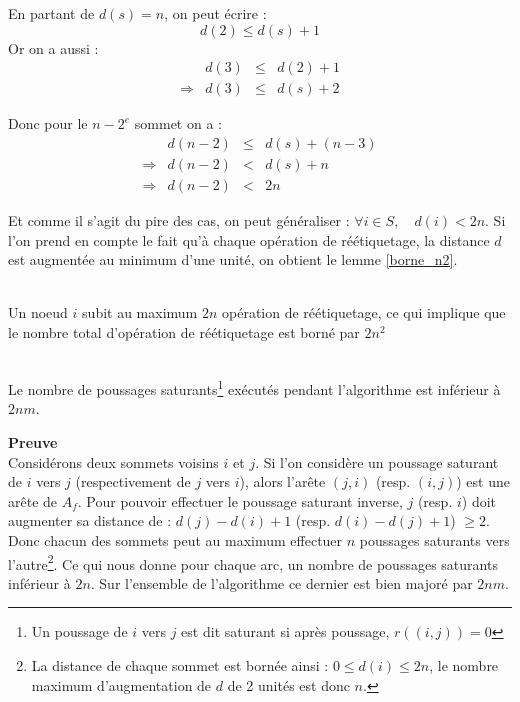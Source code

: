 En partant de $d(s) = n$, on peut écrire : $$
d(2) \leq d(s) + 1 $$ Or on a aussi : $$
\begin{array}{lrcl}
	&d(3) & \leq & d(2) + 1 \\
\Rightarrow & d(3) & \leq & d(s) + 2
\end{array} $$

Donc pour le $n-2^e$ sommet on a : $$
\begin{array}{lrcl}
	&d(n-2) &\leq& d(s) + (n - 3) \\
\Rightarrow & d(n-2) & < & d(s) + n \\
\Rightarrow & d(n-2) & < & 2n 
\end{array} $$

Et comme il s'agit du pire des cas, on peut généraliser : $\forall i \in S, \quad d(i) < 2n $.
Si l'on prend en compte le fait qu'à chaque opération de réétiquetage, la distance $d$ est augmentée
au minimum d'une unité, on obtient le lemme \ref{borne_n2}.

\begin{lemma}~\\
	\label{borne_n2}
	Un noeud $i$ subit au maximum $2n$ opération de réétiquetage, ce qui implique que le nombre total
	d'opération de réétiquetage est borné par $2n^2$
\end{lemma}

\begin{lemma}~\\
	\label{borne_ps}
	Le nombre de poussages saturants\footnote{Un poussage de $i$ vers $j$ est dit saturant si après
	poussage, $r((i,j)) = 0$} exécutés pendant l'algorithme est inférieur à $2nm$.
\end{lemma}

\textbf{Preuve}\\
Considérons deux sommets voisins $i$ et $j$. Si l'on considère un poussage saturant de $i$ vers
$j$ (respectivement de $j$ vers $i$), alors l'arête $(j, i)$ (resp. $(i,j)$) est une arête de $A_f$.
Pour pouvoir effectuer le poussage saturant inverse, $j$ (resp. $i$) doit augmenter sa distance de
: $d(j) - d(i) + 1$ (resp. $d(i) - d(j) + 1$) $\geq 2$. Donc chacun des sommets peut au maximum
effectuer $n$ poussages saturants vers l'autre\footnote{La distance de chaque sommet est bornée
ainsi : $0 \leq d(i) \leq 2n$, le nombre maximum d'augmentation de $d$ de 2 unités est donc $n$.}.
Ce qui nous donne pour chaque arc, un nombre de poussages saturants inférieur à $2n$. Sur
l'ensemble de l'algorithme ce dernier est bien majoré par $2nm$.


